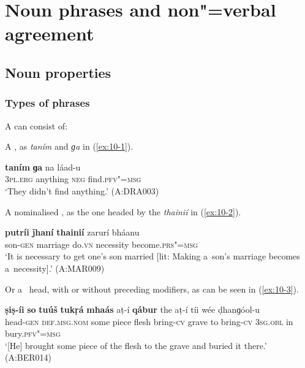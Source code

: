 \chapter{Noun phrases and non"=verbal agreement}
\label{chap:10}


\section{Noun  properties}
\label{sec:10-1}

\subsection{Types of  phrases}
\label{subsec:10-1-1}


A   can consist of: 


A , as \textit{taním} and \textit{ɡa} in (\ref{ex:10-1}).

\begin{exe}
\ex
\label{ex:10-1}
\gll \textbf{taním} \textbf{ɡa} na láad-u  \\
\textsc{3pl.erg} anything \textsc{neg} find.\textsc{pfv"=msg} \\
\glt `They didn't find anything.' (A:DRA003)
\end{exe}

A nominalised , as the one headed by the  \textit{thainií} in (\ref{ex:10-2}).

\begin{exe}
\ex
\label{ex:10-2}
\gll \textbf{putríi} \textbf{ǰhaní} \textbf{thainií} zarurí bháanu \\
son-\textsc{gen} marriage do.\textsc{vn} necessity become.\textsc{prs"=msg}  \\
\glt `It is necessary to get one's son married [lit: Making a~son's marriage becomes a~necessity].' (A:MAR009)
\end{exe}

Or a~ head, with or without preceding modifiers, as can be seen in (\ref{ex:10-3}).

\begin{exe}
\ex
\label{ex:10-3}
\gll \textbf{ṣiṣ-íi} \textbf{so} \textbf{tuúš} \textbf{tukṛá} \textbf{mhaás} aṭ-í \textbf{qábur} the aṭ-í tíi wée ḍhanɡóol-u \\
head-\textsc{gen} \textsc{def.msg.nom} some piece flesh bring-\textsc{cv} grave  to bring-\textsc{cv} \textsc{3sg.obl} in bury.\textsc{pfv"=msg}  \\
\glt `[He] brought some piece of the flesh to the grave and buried it there.' (A:BER014)
\end{exe}

